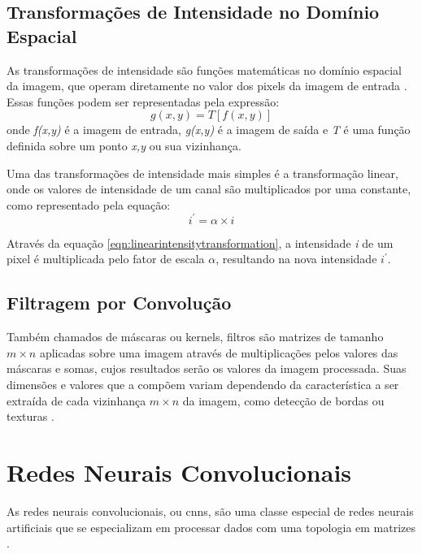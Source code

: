 \subsection{Transformações de Intensidade no Domínio Espacial}

As transformações de intensidade são funções matemáticas no domínio espacial da imagem, que operam diretamente no valor dos pixels da imagem de entrada \cite{gonzalez}.
Essas funções podem ser representadas pela expressão:
\begin{equation}
    \label{eqn:intensitytransformation}
    g(x,y) = T\left [ f(x,y) \right ]
\end{equation}
onde \textit{f(x,y)} é a imagem de entrada, \textit{g(x,y)} é a imagem de saída e \textit{T} é uma função definida sobre um ponto \textit{x,y} ou sua vizinhança.

Uma das transformações de intensidade mais simples é a transformação linear, onde os valores de intensidade de um canal são multiplicados por uma constante, como representado pela equação:
\begin{equation}
    \label{eqn:linearintensitytransformation}
    i^{'} = \alpha \times i
\end{equation}

Através da equação \ref{eqn:linearintensitytransformation}, a intensidade \textit{i} de um pixel é multiplicada pelo fator de escala $\alpha$, resultando na nova intensidade  $i^{'}$.

\subsection{Filtragem por Convolução}

Também chamados de máscaras ou kernels, filtros são matrizes de tamanho $m \times n$ aplicadas sobre uma imagem através de multiplicações pelos valores das máscaras e somas, cujos resultados serão os valores da imagem processada.
Suas dimensões e valores que a compõem variam dependendo da característica a ser extraída de cada vizinhança $m \times n$ da imagem, como detecção de bordas ou texturas \cite{shapiro}.
\section{Redes Neurais Convolucionais}

As redes neurais convolucionais, ou \acrshort{cnn}s, são uma classe especial de redes neurais artificiais que se especializam em processar dados com uma topologia em matrizes \cite{Goodfellow-et-al-2016}. 

